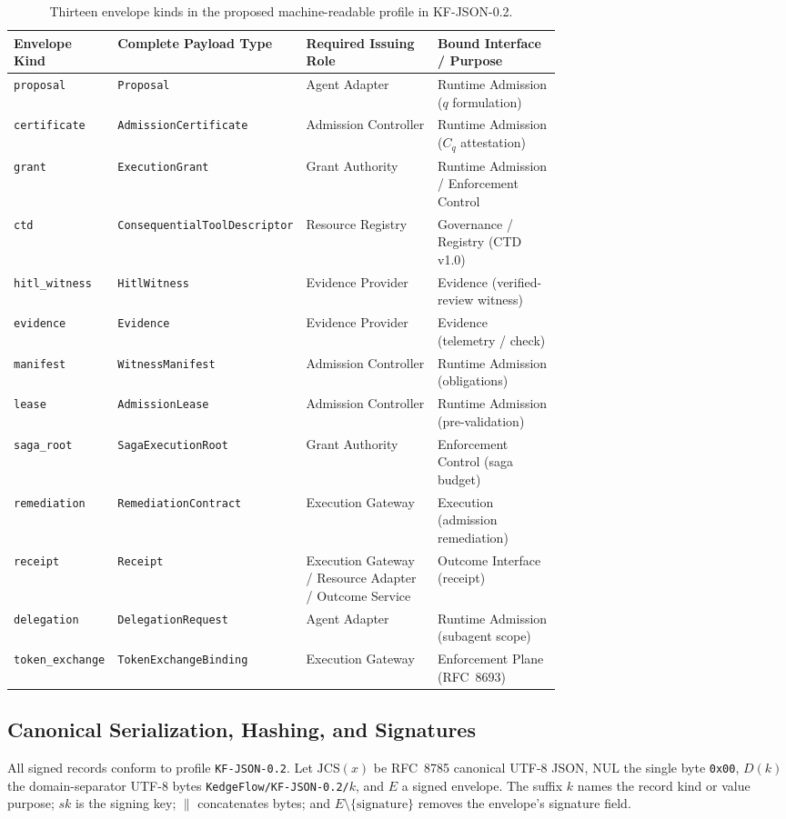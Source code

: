 \small
\begin{table}[!ht]
\centering
\begin{tabularx}{\linewidth}{L{0.18\linewidth}L{0.28\linewidth}L{0.24\linewidth}X}
\toprule
\textbf{Envelope Kind} & \textbf{Complete Payload Type} & \textbf{Required Issuing Role} & \textbf{Bound Interface / Purpose}\\
\midrule
\texttt{proposal} & \texttt{Proposal} & Agent Adapter & Runtime Admission ($q$ formulation)\\
\texttt{certificate} & \texttt{AdmissionCertificate} & Admission Controller & Runtime Admission ($C_q$ attestation)\\
\texttt{grant} & \texttt{ExecutionGrant} & Grant Authority & Runtime Admission / Enforcement Control\\
\texttt{ctd} & \scriptsize\texttt{ConsequentialToolDescriptor} & Resource Registry & Governance / Registry (CTD v1.0)\\
\texttt{hitl\_witness} & \texttt{HitlWitness} & Evidence Provider & Evidence (verified-review witness)\\
\texttt{evidence} & \texttt{Evidence} & Evidence Provider & Evidence (telemetry / check)\\
\texttt{manifest} & \texttt{WitnessManifest} & Admission Controller & Runtime Admission (obligations)\\
\texttt{lease} & \texttt{AdmissionLease} & Admission Controller & Runtime Admission (pre-validation)\\
\texttt{saga\_root} & \texttt{SagaExecutionRoot} & Grant Authority & Enforcement Control (saga budget)\\
\texttt{remediation} & \texttt{RemediationContract} & Execution Gateway & Execution (admission remediation)\\
\texttt{receipt} & \texttt{Receipt} & Execution Gateway / Resource Adapter / Outcome Service & Outcome Interface (receipt)\\
\texttt{delegation} & \texttt{DelegationRequest} & Agent Adapter & Runtime Admission (subagent scope)\\
\texttt{token\_exchange} & \texttt{TokenExchangeBinding} & Execution Gateway & Enforcement Plane (RFC~8693)\\
\bottomrule
\end{tabularx}
\caption{Thirteen envelope kinds in the proposed machine-readable profile in KF-JSON-0.2.}
\label{tab:contract-envelopes}
\end{table}
\normalsize

\subsection{Canonical Serialization, Hashing, and Signatures}
All signed records conform to profile \texttt{KF-JSON-0.2}. Let $\mathrm{JCS}(x)$ be RFC~8785 canonical UTF-8 JSON, $\mathrm{NUL}$ the single byte \texttt{0x00}, $D(k)$ the domain-separator UTF-8 bytes \texttt{KedgeFlow/KF-JSON-0.2/}$k$, and $E$ a signed envelope. The suffix $k$ names the record kind or value purpose; $sk$ is the signing key; $\parallel$ concatenates bytes; and $E\setminus\{\text{signature}\}$ removes the envelope's signature field.

